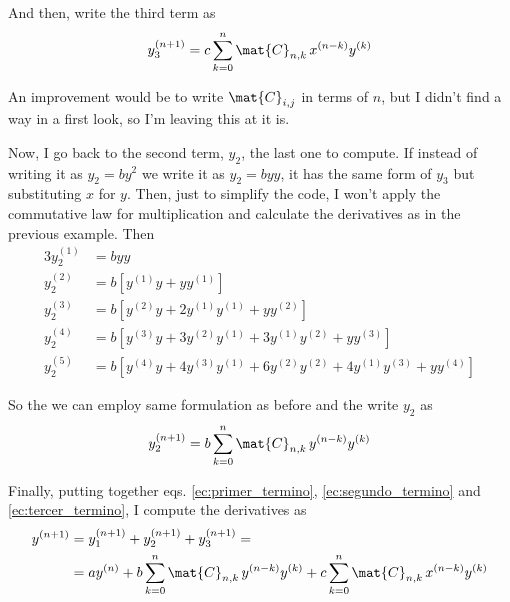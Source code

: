 \documentclass[12pt, a4paper]{article}
\begin{document}
And then, write the third term as
\begin{equation}\label{ec:tercer_termino}
    y_3^{(n+1)} = c \sum_{k=0}^{n} \mat{C}_{n,k}\, x^{(n-k)} y^{(k)}
\end{equation}

An improvement would be to write $\mat{C}_{i,j}$ in terms of $n$, but I didn't find a way in a first look, so I'm leaving this at it is.

Now, I go back to the second term, $y_2$, the last one to compute. If instead of writing it as $y_2 = by^2$ we write it as $y_2 = byy$, it has the same form of $y_3$ but substituting $x$ for $y$. Then, just to simplify the code, I won't apply the commutative law for multiplication and calculate the derivatives as in the previous example. Then
\begin{alignat*}{3}
    y_2^{(1)} &= b y y \\
    y_2^{(2)} &= b \left[ y^{(1)} y +   y y^{(1)}  \right] \\
    y_2^{(3)} &= b \left[ y^{(2)} y + 2 y^{(1)} y^{(1)} +   y y^{(2)}  \right] \\
    y_2^{(4)} &= b \left[ y^{(3)} y + 3 y^{(2)} y^{(1)} + 3 y^{(1)} y^{(2)} +   y y^{(3)} \right] \\
    y_2^{(5)} &= b \left[ y^{(4)} y + 4 y^{(3)} y^{(1)} + 6 y^{(2)} y^{(2)} + 4 y^{(1)} y^{(3)} + y y^{(4)} \right]
\end{alignat*}

So the we can employ same formulation as before and the write $y_2$ as
\begin{equation}\label{ec:segundo_termino}
    y_2^{(n+1)} = b \sum_{k=0}^{n} \mat{C}_{n,k}\, y^{(n-k)} y^{(k)}
\end{equation}

Finally, putting together eqs. \eqref{ec:primer_termino}, \eqref{ec:segundo_termino} and \eqref{ec:tercer_termino}, I compute the derivatives as
\begin{align}
    y^{(n+1)} &= y_1^{(n+1)} + y_2^{(n+1)} + y_3^{(n+1)} = \\
              &= a y^{(n)} + b \sum_{k=0}^{n} \mat{C}_{n,k}\, y^{(n-k)} y^{(k)} + c \sum_{k=0}^{n} \mat{C}_{n,k}\, x^{(n-k)} y^{(k)}
\end{align}
\end{document}

